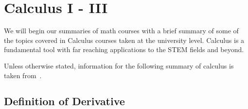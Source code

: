 \section{Calculus I - III} %

We will begin our summaries of math courses with a brief summary of some of the topics covered in Calculus courses taken at the university level. Calculus is a fundamental tool with far reaching applications to the STEM fields and beyond.\newline

Unless otherwise stated, information  for the following summary of calculus is taken from~\cite{Calculus}.


\subsection{Definition of Derivative} %

